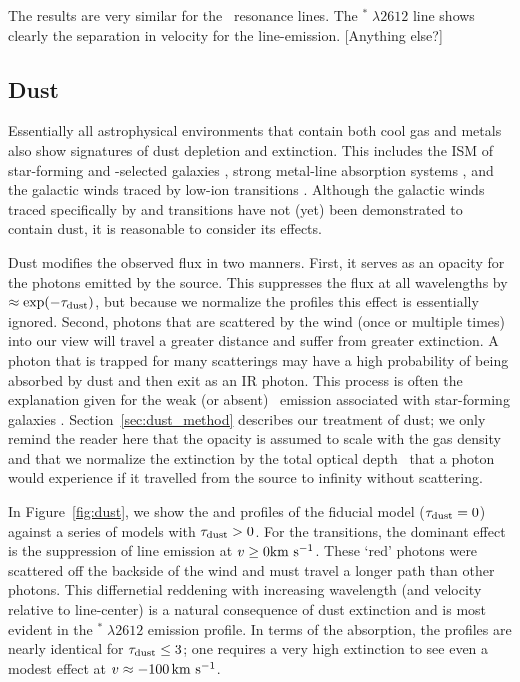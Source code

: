 \documentclass[12pt,preprint]{aastex}
\begin{document}
The results are very similar for the \feiid\ resonance lines.  The
$^* \; \lambda 2612$ line shows clearly the
separation in velocity for the line-emission.   [Anything else?]

\subsection{Dust}
\label{sec:dust}

Essentially all astrophysical environments that contain both cool gas
and metals also show signatures of dust depletion and extinction.  This includes the
ISM of star-forming and -selected galaxies
\citep[e.g.][]{ss96,pw01,pcd+07}, strong  metal-line
absorption systems \citep{york,menard}, and the galactic winds traced
by low-ion transitions \citep{cb58,naI}.  Although the galactic winds
traced specifically by  and  transitions have not (yet) been
demonstrated to contain dust, it is reasonable to consider its
effects.

Dust modifies the observed flux in two manners. 
First, it serves as an opacity for the photons
emitted by the source.  This suppresses the flux at all
wavelengths by $\approx \exp(-\tau_{\rm dust})$, but because we normalize the profiles 
this effect is essentially ignored.  Second, photons that are
scattered by the wind (once or multiple times) into our view will travel a greater
distance and suffer from greater extinction.  A photon that is
trapped for many scatterings may have a high probability of being absorbed
by dust and then exit as an IR photon.  This process is
often the explanation given for the weak (or absent) \lya\ emission
associated with star-forming galaxies \citep[e.g.][]{lya}.
Section~\ref{sec:dust_method} describes our treatment of dust; we only
remind the reader here that the opacity is assumed to scale with the
gas density and that we normalize the extinction by the total optical
depth \taud\ that a photon would experience if it travelled from the
source to infinity without scattering. 

In Figure~\ref{fig:dust}, we show the  and 
profiles of the fiducial model ($\tau_{\rm dust} = 0$) against a series of
models with $\tau_{\rm dust} > 0$.  For the  transitions, the
dominant effect is the suppression of line emission at $v \ge 0
{\rm km~s^{-1}}$.  These `red' photons were scattered off the
backside of the wind and must travel a longer path than other
photons.  This differnetial reddening with increasing wavelength (and
velocity relative to line-center) is a natural consequence of dust
extinction and is most evident in the $^* \; \lambda 2612$
emission profile.   In terms of the absorption, the profiles are
nearly identical for $\tau_{\rm dust} \le 3$; one requires a very high
extinction to see even a modest effect at $v \approx -100 \, {\rm km~s^{-1}}$.
\end{document}
